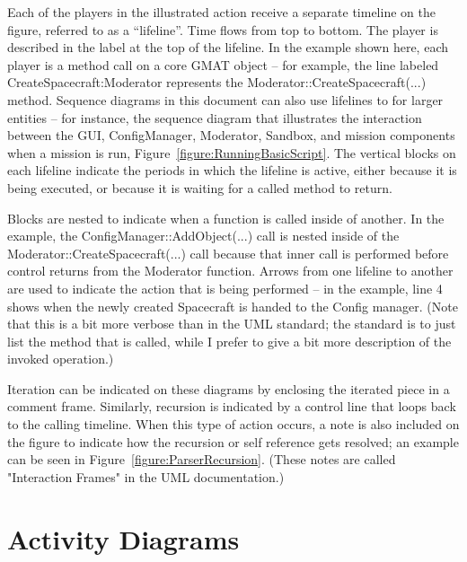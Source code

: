 Each of the players in the illustrated action receive a separate timeline on the figure, referred to
as a ``lifeline''.  Time flows from top to bottom.  The player is described in the label at the top
of the lifeline.  In the example shown here, each player is a method call on a core GMAT object --
for example, the line labeled CreateSpacecraft:Moderator represents the
Moderator::CreateSpacecraft(...) method.  Sequence diagrams in this document can also use lifelines
to for larger entities -- for instance, the sequence diagram that illustrates the interaction
between the GUI, ConfigManager, Moderator, Sandbox, and mission components when a mission is run,
Figure~\ref{figure:RunningBasicScript}.  The vertical blocks on each lifeline indicate the periods
in which the lifeline is active, either because it is being executed, or because it is waiting for a
called method to return.

Blocks are nested to indicate when a function is called inside of another.  In the example, the
ConfigManager::AddObject(...) call is nested inside of the Moderator::CreateSpacecraft(...) call
because that inner call is performed before control returns from the Moderator function.  Arrows
from one lifeline to another are used to indicate the action that is being performed -- in the
example, line 4 shows when the newly created Spacecraft is handed to the Config manager.  (Note that
this is a bit more verbose than in the UML standard; the standard is to just list the method that is
called, while I prefer to give a bit more description of the invoked operation.)

Iteration can be indicated on these diagrams by enclosing the iterated piece in a comment frame. 
Similarly, recursion is indicated by a control line that loops back to the calling timeline.  When
this type of action occurs, a note is also included on the figure to indicate how the recursion or
self reference gets resolved; an example can be seen in Figure~\ref{figure:ParserRecursion}.  (These
notes are called "Interaction Frames" in the UML documentation.)

\section{Activity Diagrams}

